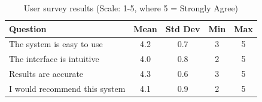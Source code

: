 \begin{table}[H]
    \centering
    \caption{User survey results (Scale: 1-5, where 5 = Strongly Agree)}
    \label{tab:survey_results}
    \begin{tabular}{@{}lcccc@{}}
        \toprule
        \textbf{Question} & \textbf{Mean} & \textbf{Std Dev} & \textbf{Min} & \textbf{Max} \\
        \midrule
        The system is easy to use & 4.2 & 0.7 & 3 & 5 \\
        The interface is intuitive & 4.0 & 0.8 & 2 & 5 \\
        Results are accurate & 4.3 & 0.6 & 3 & 5 \\
        I would recommend this system & 4.1 & 0.9 & 2 & 5 \\
        \bottomrule
    \end{tabular}
\end{table}